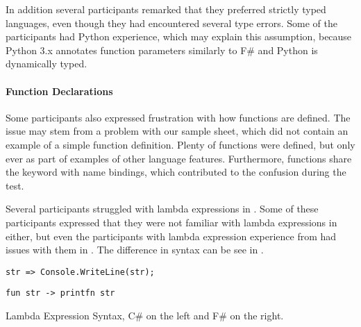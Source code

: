 In addition several participants remarked that they preferred strictly typed languages, even though they had encountered several type errors. Some of the participants had Python experience, which may explain this assumption, because Python 3.x annotates function parameters similarly to F\# and Python is dynamically typed.

\paragraph{Function Declarations}
Some participants also expressed frustration with how functions are defined. The issue may stem from a problem with our sample sheet, which did not contain an example of a simple function definition. Plenty of functions were defined, but only ever as part of examples of other language features. Furthermore, functions share the  keyword with name bindings, which contributed to the confusion during the test.

Several participants struggled with lambda expressions in \fs. Some of these participants expressed that they were not familiar with lambda expressions in \cs either, but even the participants with lambda expression experience from \cs had issues with them in \fs. The difference in syntax can be see in .

\begin{listing}[H]
\begin{minipage}{.5\textwidth}
\begin{verbatim}
str => Console.WriteLine(str);
\end{verbatim}
\end{minipage}
\hfill
\begin{minipage}{.4\textwidth}
\begin{verbatim}
fun str -> printfn str
\end{verbatim}
\end{minipage}
\caption{Lambda Expression Syntax, C\# on the left and F\# on the right.}
\label{lst:lam-exp-syn}
\end{listing}